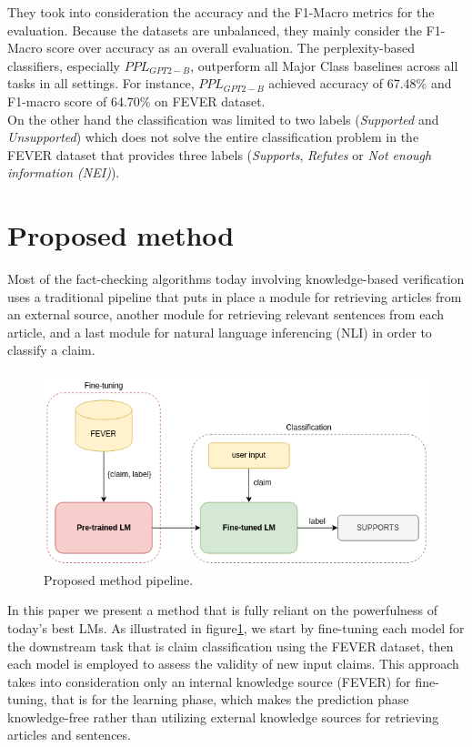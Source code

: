 \documentclass[conference]{IEEEtran}
\begin{document}
They took into consideration the accuracy and the F1-Macro metrics for the evaluation. Because the datasets are unbalanced, they mainly consider the F1-Macro score over accuracy as an overall evaluation. The perplexity-based classifiers, especially $PPL_{GPT2-B}$, outperform all Major Class baselines across all
tasks in all settings. For instance, $PPL_{GPT2-B}$ achieved accuracy of 67.48\% and F1-macro score of 64.70\% on FEVER dataset.\\
On the other hand the classification was limited to two labels (\emph{Supported} and \emph{Unsupported}) which does not solve the entire classification problem in the FEVER dataset that provides three labels (\textit{Supports}, \textit{Refutes} or \textit{Not enough information (NEI)}).

\section{Proposed method}
Most of the fact-checking algorithms today involving knowledge-based verification uses a traditional pipeline that puts in place a module for retrieving articles from an external source, another module for retrieving relevant sentences from each article, and a last module for natural language inferencing (NLI) in order to classify a claim.

\begin{figure}[htp]
    \centering
    \includegraphics[scale=0.4]{processing_pipeline.png}
    \caption{Proposed method pipeline.}
    \label{fig:processing_pipeline}
\end{figure}


In this paper we present a method that is fully  reliant on the powerfulness of today's best LMs. As illustrated in figure\ref{fig:processing_pipeline}, we start by fine-tuning each model for the downstream task that is claim classification using the FEVER dataset, then each model is employed to assess the validity of new input claims. This approach takes into consideration only an internal knowledge source (FEVER) for fine-tuning, that is for the learning phase, which makes the prediction phase knowledge-free rather than utilizing external knowledge sources for retrieving articles and sentences.
\end{document}
